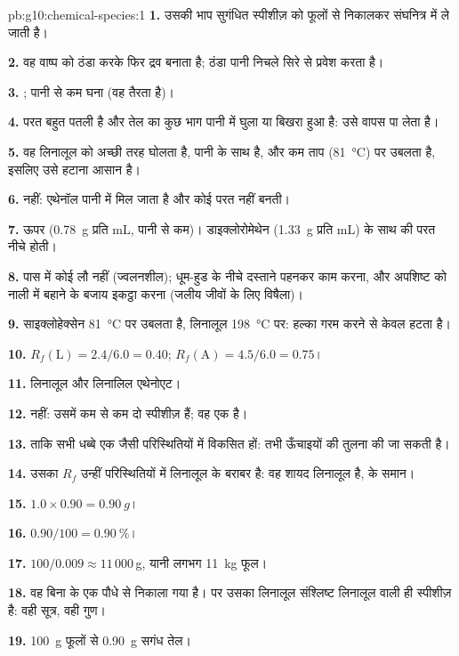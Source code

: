 \begin{solution}{pb:g10:chemical-species:1}
\textbf{1.} उसकी भाप सुगंधित स्पीशीज़ को फूलों से निकालकर संघनित्र में
ले जाती है।

\textbf{2.} वह वाष्प को ठंडा करके फिर द्रव बनाता है; ठंडा पानी निचले सिरे से
प्रवेश करता है।

\textbf{3.} ; पानी से कम घना (वह तैरता है)।

\textbf{4.} परत बहुत पतली है और तेल का कुछ भाग पानी में घुला या बिखरा हुआ है:
 उसे वापस पा लेता है।

\textbf{5.} वह लिनालूल को अच्छी तरह घोलता है, पानी के साथ  है, और कम ताप
(\qty{81}{\celsius}) पर उबलता है, इसलिए उसे हटाना आसान है।

\textbf{6.} नहीं: एथेनॉल पानी में मिल जाता है और कोई परत नहीं बनती।

\textbf{7.} ऊपर (\qty{0.78}{g} प्रति mL, पानी से कम)।
डाइक्लोरोमेथेन (\qty{1.33}{g} प्रति mL) के साथ  की परत
नीचे होती।

\textbf{8.} पास में कोई लौ नहीं (ज्वलनशील); धूम-हुड के नीचे दस्ताने पहनकर
काम करना, और अपशिष्ट को नाली में बहाने के बजाय इकट्ठा करना
(जलीय जीवों के लिए विषैला)।

\textbf{9.} साइक्लोहेक्सेन \qty{81}{\celsius} पर उबलता है, लिनालूल
\qty{198}{\celsius} पर: हल्का गरम करने से केवल  हटता है।

\textbf{10.} $R_f(\text{L}) = 2.4/6.0 = 0.40$; $R_f(\text{A}) = 4.5/6.0
= 0.75$।

\textbf{11.} लिनालूल और लिनालिल एथेनोएट।

\textbf{12.} नहीं: उसमें कम से कम दो स्पीशीज़ हैं; वह एक  है।

\textbf{13.} ताकि सभी धब्बे एक जैसी परिस्थितियों में विकसित हों:
तभी ऊँचाइयों की तुलना की जा सकती है।

\textbf{14.} उसका $R_f$ उन्हीं परिस्थितियों में लिनालूल के बराबर है: वह
शायद लिनालूल है,  के समान।

\textbf{15.} $1.0 \times 0.90 = \qty{0.90}{g}$।

\textbf{16.} $0.90/100 = \qty{0.90}{\percent}$।

\textbf{17.} $100/0.009 \approx 11\,000$\,g, यानी लगभग \qty{11}{kg}
फूल।

\textbf{18.} वह बिना  के एक पौधे से निकाला गया है। पर उसका
लिनालूल संश्लिष्ट लिनालूल वाली ही स्पीशीज़ है: वही सूत्र, वही
गुण।

\textbf{19.} \qty{100}{g} फूलों से \qty{0.90}{g} सगंध तेल।
\end{solution}
